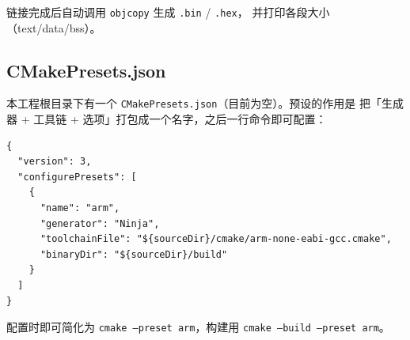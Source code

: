 链接完成后自动调用 \texttt{objcopy} 生成 \texttt{.bin} / \texttt{.hex}，
并打印各段大小（text/data/bss）。

\subsection{CMakePresets.json}

本工程根目录下有一个 \texttt{CMakePresets.json}（目前为空）。预设的作用是
把「生成器 + 工具链 + 选项」打包成一个名字，之后一行命令即可配置：

\begin{lstlisting}[style=generic]
{
  "version": 3,
  "configurePresets": [
    {
      "name": "arm",
      "generator": "Ninja",
      "toolchainFile": "${sourceDir}/cmake/arm-none-eabi-gcc.cmake",
      "binaryDir": "${sourceDir}/build"
    }
  ]
}
\end{lstlisting}

配置时即可简化为 \texttt{cmake --preset arm}，构建用
\texttt{cmake --build --preset arm}。
